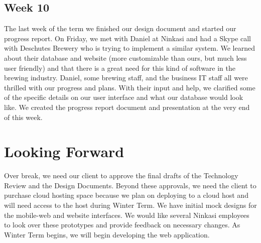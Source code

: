 \documentclass[draftclsnofoot,onecolumn,letterpaper,10pt,compsoc]{IEEEtran}
\begin{document}
\subsection{Week 10}
The last week of the term we finished our design document and started our progress report.
On Friday, we met with Daniel at Ninkasi and had a Skype call with Deschutes Brewery who is trying to implement a similar system.
We learned about their database and website (more customizable than ours, but much less user friendly) and that there is a great need for this kind of software in the brewing industry.
Daniel, some brewing staff, and the business IT staff all were thrilled with our progress and plans.
With their input and help, we clarified some of the specific details on our user interface and what our database would look like.
We created the progress report document and presentation at the very end of this week.

\section{Looking Forward}
Over break, we need our client to approve the final drafts of the Technology Review and the Design Documents.
Beyond these approvals, we need the client to purchase cloud hosting space because we plan on deploying to a cloud host and will need access to the host during Winter Term.
We have initial mock designs for the mobile-web and website interfaces.
We would like several Ninkasi employees to look over these prototypes and provide feedback on necessary changes.
As Winter Term begins, we will begin developing the web application.
\end{document}
